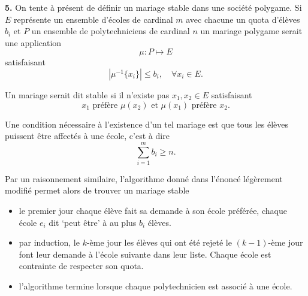 \documentclass[12pt]{article}\usepackage[top=1in, bottom=1in, left=1in, right=1in]{geometry}
\begin{document}
\bigskip

\textbf{5.} On tente à présent de définir un mariage stable dans une société polygame. Si $E$ représente un ensemble d'écoles de cardinal $m$ avec chacune un quota d'élèves $b_i$ et $P$ un ensemble de polytechniciens de cardinal $n$ un mariage polygame serait une application
\[
        \mu : P \longmapsto E
\] 
satisfaisant \[
        |\mu^{-1}\{x_{i}\}| \le b_{i}, \quad \forall x_{i} \in E
.\] 

Un mariage serait dit stable si il n'existe pas $x_1, x_2 \in E$ satisfaisant \[
        x_1 \text{ préfère } \mu(x_2) \text{ et } \mu(x_1) \text{ préfère } x_2
.\] 

Une condition nécessaire à l'existence d'un tel mariage est que tous les élèves puissent être affectés à une école, c'est à dire \[
\sum_{i=1}^{m} b_{i} \ge n
.\] 

Par un raisonnement similaire, l'algorithme donné dans l'énoncé légèrement modifié permet alors de trouver un mariage stable
\begin{itemize}
        \item le premier jour chaque élève fait sa demande à son école préférée, chaque école $e_{i}$ dit `peut être' à au plus $b_{i}$ élèves.
        \item par induction, le $k$-ème jour les élèves qui ont été rejeté le $(k-1)$-ème jour font leur demande à l'école suivante dans leur liste. Chaque école est contrainte de respecter son quota.
        \item l'algorithme termine lorsque chaque polytechnicien est associé à une école.
\end{itemize}
\end{document}

